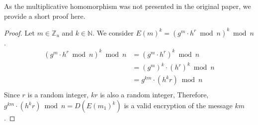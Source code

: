 As the multiplicative homomorphism was not presented in the original paper, we provide a short proof here.
\begin{proof}
  Let $m \in \mathbb{Z}_u$ and $k\in \mathbb{N}$.
  We consider $E(m)^k = (g^m \cdot h^r \bmod{n})^k\bmod n$.
  \begin{align*}
    (g^m \cdot h^r \bmod{n})^k \bmod n
    &= (g^m \cdot h^r)^k \bmod{n}\\
    &= (g^m)^k \cdot (h^r)^k \bmod{n}\\
    &= g^{km} \cdot (h^kr) \bmod{n}\\
  \end{align*}
  Since $r$ is a random integer, $kr$ is also a random integer, Therefore, $g^{km} \cdot (h^kr) \bmod{n} = D(E(m_1)^k)$ is a valid encryption of the message $km$.
\end{proof}




